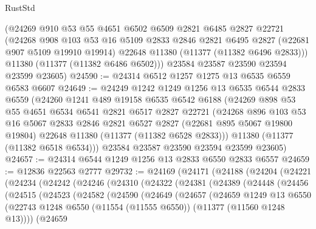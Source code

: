 \begin{lexlean}{RustStd}
\begin{coremodule}
      (@24269
        @910
        @53
        @55
        @4651
        @6502
        @6509
        @2821
        @6485
        @2827
        @22721
        (@24268
          @908
          @103
          @53
          @16
          @5109
          @2833
          @2846
          @2821
          @6495
          @2827
          (@22681 @907 @5109 @19910 @19914)
          @22648
          @11380
          (@11377 (@11382 @6496 @2833)))
        @11380
        (@11377 (@11382 @6486 @6502)))
      @23584
      @23587
      @23590
      @23594
      @23599
      @23605)
@24590 := @24314 @6512 @1257 @1275 @13 @6535 @6559 @6583 @6607
@24649 := @24249
    @1242
    @1249
    @1256
    @13
    @6535
    @6544
    @2833
    @6559
    (@24260
      @1241
      @489
      @19158
      @6535
      @6542
      @6188
      (@24269
        @898
        @53
        @55
        @4651
        @6534
        @6541
        @2821
        @6517
        @2827
        @22721
        (@24268
          @896
          @103
          @53
          @16
          @5067
          @2833
          @2846
          @2821
          @6527
          @2827
          (@22681 @895 @5067 @19800 @19804)
          @22648
          @11380
          (@11377 (@11382 @6528 @2833)))
        @11380
        (@11377 (@11382 @6518 @6534)))
      @23584
      @23587
      @23590
      @23594
      @23599
      @23605)
@24657 := @24314 @6544 @1249 @1256 @13 @2833 @6550 @2833 @6557
@24659 := @12836 @22563 @2777
@29732 := @24169
    (@24171
      (@24188
        (@24204
          (@24221
            (@24234
              (@24242
                (@24246
                  (@24310
                    (@24322
                      (@24381
                        (@24389
                          (@24448
                            (@24456
                              (@24515
                                (@24523
                                  (@24582
                                    (@24590
                                      (@24649
                                        (@24657
                                          (@24659
                                            @1249
                                            @13
                                            @6550
                                            (@22743
                                              @1248
                                              @6550
                                              (@11554 (@11555 @6550))
                                              (@11377 (@11560 @1248 @13))))
                                          (@24659

\end{coremodule}
\end{lexlean}
